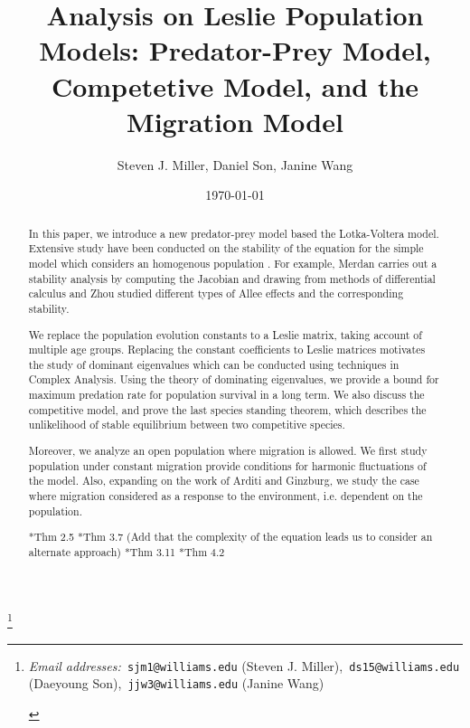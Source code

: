 \documentclass[11pt,reqno]{amsart}
\title{Analysis on Leslie Population Models: Predator-Prey Model, Competetive Model, and the Migration Model}
\author[Miller, Son, Wang]{Steven J. Miller, Daniel Son, Janine Wang}
\date{\today}
\numberwithin{equation}{section}
\theoremstyle{plain}
\newcommand\blfootnote[1]{%
  \begingroup
  \renewcommand\thefootnote{}\footnote{#1}%
  \addtocounter{footnote}{-1}%
  \endgroup
}
\begin{document}
\blfootnote{
\begin{center}
\textit{Email addresses:}\texttt{~sjm1@williams.edu} (Steven J. Miller),\texttt{~ds15@williams.edu} (Daeyoung Son),\texttt{~jjw3@williams.edu} (Janine Wang)
\end{center}
}
\maketitle


\begin{abstract} 

    
In this paper, we introduce a new predator-prey model based 
the Lotka-Voltera model. Extensive study have been conducted 
on the stability of the equation for the simple model which 
considers an homogenous population
. For example, Merdan \cite{Merdan2009} 
\cite{Merdan2010} carries 
out a stability analysis by computing the Jacobian and 
drawing from methods of differential calculus and Zhou \cite{Zhou2005} studied different types of Allee effects and 
the corresponding stability. 

We replace the population evolution constants 
to a Leslie matrix, taking account of multiple age groups. 
Replacing the constant coefficients to 
Leslie matrices motivates the study of dominant eigenvalues 
which can be conducted using techniques in Complex Analysis. 
Using the theory of dominating eigenvalues, we provide a bound 
for maximum predation rate for population survival in a long term. 
We also discuss the competitive model, and prove the 
last species standing theorem, which describes the unlikelihood 
of stable equilibrium between two competitive species. 

Moreover, we analyze an open population where migration 
is allowed. We first study 
population under constant migration provide conditions for harmonic fluctuations 
of the model. Also, expanding on the work of Arditi 
and Ginzburg, we study the case where migration considered 
as a response to the environment, i.e. dependent on the population. 


*Thm 2.5
*Thm 3.7 (Add that the complexity of the equation leads us to consider an alternate approach)
*Thm 3.11
*Thm 4.2
\end{abstract}

\tableofcontents

\end{document}
